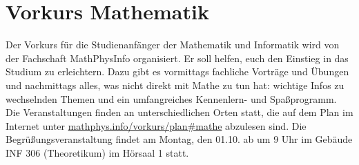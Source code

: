 \section{Vorkurs Mathematik}
Der Vorkurs für die Studienanfänger der Mathematik und Informatik wird von der Fachschaft MathPhysInfo organisiert. Er soll helfen, euch den Einstieg in das Studium zu erleichtern. Dazu gibt es vormittags fachliche Vorträge und Übungen und nachmittags alles, was nicht direkt mit Mathe zu tun hat: wichtige Infos zu wechselnden Themen und ein umfangreiches Kennenlern- und Spaßprogramm.
Die Veranstaltungen finden an unterschiedlichen Orten statt, die auf dem Plan im Internet unter \url{mathphys.info/vorkurs/plan\#mathe} abzulesen sind. Die Begrüßungsveranstaltung findet am Montag, den 01.10. ab um 9 Uhr im Gebäude \gls{INF} 306 (Theoretikum) im Hörsaal 1 statt.
